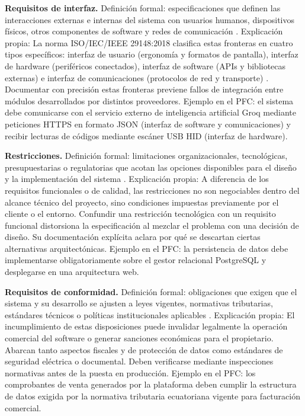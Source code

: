 \documentclass[onecolumn,12pt]{IEEEtran}
\begin{document}
	\textbf{Requisitos de interfaz.} Definici\'on formal: especificaciones que definen las interacciones externas e internas del sistema con usuarios humanos, dispositivos f\'isicos, otros componentes de software y redes de comunicaci\'on \cite{iso29148,hull2011}. Explicaci\'on propia: La norma ISO/IEC/IEEE 29148:2018 clasifica estas fronteras en cuatro tipos espec\'ificos: interfaz de usuario (ergonom\'ia y formatos de pantalla), interfaz de hardware (perif\'ericos conectados), interfaz de software (APIs y bibliotecas externas) e interfaz de comunicaciones (protocolos de red y transporte) \cite{iso29148}.
	Documentar con precisi\'on estas fronteras previene fallos de integraci\'on entre m\'odulos desarrollados por distintos proveedores. Ejemplo en el PFC: el sistema debe comunicarse con el servicio externo de inteligencia artificial Groq mediante peticiones HTTPS en formato JSON (interfaz de software y comunicaciones) y recibir lecturas de c\'odigos mediante esc\'aner USB HID (interfaz de hardware).
	
	\textbf{Restricciones.} Definici\'on formal: limitaciones organizacionales, tecnol\'ogicas, presupuestarias o regulatorias que acotan las opciones disponibles para el dise\~no y la implementaci\'on del sistema \cite{pohl2025,glinz2007,ireb2023}. Explicaci\'on propia: A diferencia de los requisitos funcionales o de calidad, las restricciones no son negociables dentro del alcance t\'ecnico del proyecto, sino condiciones impuestas previamente por el cliente o el entorno. Confundir una restricci\'on tecnol\'ogica con un requisito funcional distorsiona la especificaci\'on al mezclar el problema con una decisi\'on de dise\~no. Su documentaci\'on expl\'icita aclara por qu\'e se descartan ciertas alternativas arquitect\'onicas. Ejemplo en el PFC: la persistencia de datos debe implementarse obligatoriamente sobre el gestor relacional PostgreSQL y desplegarse en una arquitectura web.
	
	\textbf{Requisitos de conformidad.} Definici\'on formal: obligaciones que exigen que el sistema y su desarrollo se ajusten a leyes vigentes, normativas tributarias, est\'andares t\'ecnicos o pol\'iticas institucionales aplicables \cite{iso29148,swebok4}. Explicaci\'on propia: El incumplimiento de estas disposiciones puede invalidar legalmente la operaci\'on comercial del software o generar sanciones econ\'omicas para el propietario. Abarcan tanto aspectos fiscales y de protecci\'on de datos como est\'andares de seguridad el\'ectrica o documental. Deben verificarse mediante inspecciones normativas antes de la puesta en producci\'on. Ejemplo en el PFC: los comprobantes de venta generados por la plataforma deben cumplir la estructura de datos exigida por la normativa tributaria ecuatoriana vigente para facturaci\'on comercial.
	
\end{document}
